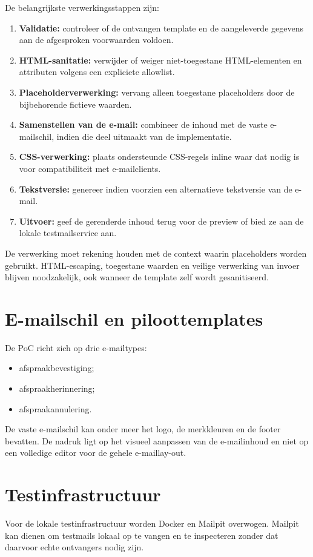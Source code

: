 De belangrijkste verwerkingsstappen zijn:

\begin{enumerate}
    \item \textbf{Validatie:} controleer of de ontvangen template en de
    aangeleverde gegevens aan de afgesproken voorwaarden voldoen.
    \item \textbf{HTML-sanitatie:} verwijder of weiger niet-toegestane
    HTML-elementen en attributen volgens een expliciete allowlist.
    \item \textbf{Placeholderverwerking:} vervang alleen toegestane
    placeholders door de bijbehorende fictieve waarden.
    \item \textbf{Samenstellen van de e-mail:} combineer de inhoud met de
    vaste e-mailschil, indien die deel uitmaakt van de implementatie.
    \item \textbf{CSS-verwerking:} plaats ondersteunde CSS-regels inline
    waar dat nodig is voor compatibiliteit met e-mailclients.
    \item \textbf{Tekstversie:} genereer indien voorzien een alternatieve
    tekstversie van de e-mail.
    \item \textbf{Uitvoer:} geef de gerenderde inhoud terug voor de preview
    of bied ze aan de lokale testmailservice aan.
\end{enumerate}

De verwerking moet rekening houden met de context waarin placeholders
worden gebruikt. HTML-escaping, toegestane waarden en veilige verwerking
van invoer blijven noodzakelijk, ook wanneer de template zelf wordt
gesanitiseerd.

\section{E-mailschil en piloottemplates}
De PoC richt zich op drie e-mailtypes:
\begin{itemize}
    \item afspraakbevestiging;
    \item afspraakherinnering;
    \item afspraakannulering.
\end{itemize}

De vaste e-mailschil kan onder meer het logo, de merkkleuren en de footer
bevatten. De nadruk ligt op het visueel aanpassen van de e-mailinhoud en
niet op een volledige editor voor de gehele e-maillay-out.

\section{Testinfrastructuur}
Voor de lokale testinfrastructuur worden Docker en Mailpit overwogen.
Mailpit kan dienen om testmails lokaal op te vangen en te inspecteren zonder
dat daarvoor echte ontvangers nodig zijn.

